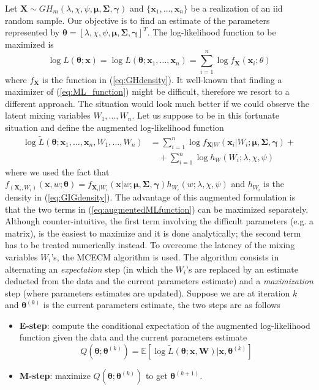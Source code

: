 Let $\bm{X} \sim GH_m(\lambda,\chi,\psi,\bm{\mu},\bm{\Sigma},\bm{\gamma})$ and $\{\bm{x}_1,\ldots,\bm{x}_n\}$ be a realization of an iid random sample. Our objective is to find an estimate of the parameters represented by $\bm{\theta}=[\lambda,\chi,\psi,\bm{\mu},\bm{\Sigma},\bm{\gamma}]^T$. The log-likelihood function to be maximized is
\begin{equation}\label{eq:ML_function}
\log L(\bm{\theta};\bm{x}) = \log L(\bm{\theta};\bm{x}_1,\ldots,\bm{x}_n) = \sum_{i=1}^{n}\log f_{\bm{X}}(\bm{x}_i;\theta)
\end{equation}
where $f_{\bm{X}}$ is the function in (\ref{eq:GHdensity}). It well-known that finding a maximizer of (\ref{eq:ML_function}) might be difficult, therefore we resort to a different approach. The situation would look much better if we could observe the latent mixing variables $W_1,\ldots,W_n$. Let us suppose to be in this fortunate situation and define the augmented log-likelihood function
\begin{align}\label{eq:augmentedMLfunction}
\log \widetilde{L}(\bm{\theta};\bm{x}_1,\ldots,\bm{x}_n,W_1,\ldots,W_n)& = \sum_{i=1}^{n}\log f_{\bm{X}\lvert W}(\bm{x}_i\lvert W_i;\bm{\mu},\bm{\Sigma},\bm{\gamma}) + \\\nonumber
& \quad + \sum_{i=1}^{n}\log h_{W}(W_i;\lambda,\chi,\psi)
\end{align}
where we used the fact that $f_{(\bm{X}_i,W_i)}(\bm{x},w;\bm{\theta})= f_{\bm{X}_i\lvert W_i}(\bm{x}\lvert w;\bm{\mu},\bm{\Sigma},\bm{\gamma})h_{W_i} (w;\lambda,\chi,\psi) $ and $h_{W_i}$ is the density in (\ref{eq:GIGdensity}). The advantage of this augmented formulation is that the two terms in (\ref{eq:augmentedMLfunction}) can be maximized separately. Although counter-intuitive, the first term involving the difficult parameters (e.g. a matrix), is the easiest to maximize and it is done analytically; the second term has to be treated numerically instead. To overcome the latency of the mixing variables $W_i$'s, the MCECM algorithm is used. The algorithm consists in alternating an \textit{expectation} step (in which the $W_i$'s are replaced by an estimate deducted from the data and the current parameters estimate) and a \textit{maximization} step (where parameters estimates are updated). Suppose we are at iteration $k$ and $\bm{\theta}^{(k)}$ is the current parameters estimate, the two steps are as follows
\begin{itemize}
	\item \textbf{E-step}: compute the conditional expectation of the augmented log-likelihood function given the data and the current parameters estimate 
	\begin{equation}\label{eq:Q}
	Q(\bm{\theta};\bm{\theta}^{(k)}) = \mathbb{E}[\log \widetilde{L}(\bm{\theta};\bm{x},\bm{W})\lvert \bm{x},\bm{\theta}^{(k)}]
	\end{equation}
	\item \textbf{M-step}: maximize $Q(\bm{\theta};\bm{\theta}^{(k)})$ to get $\bm{\theta}^{(k+1)}$.
\end{itemize}

